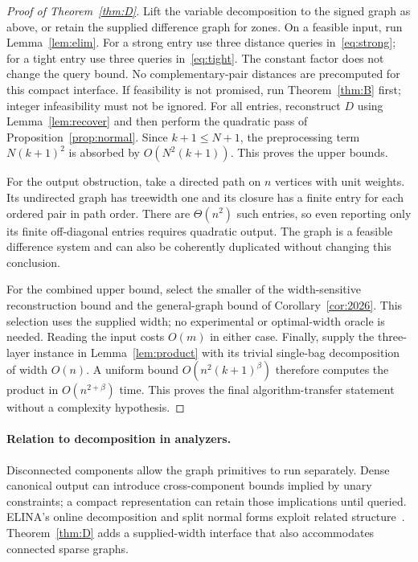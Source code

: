 \documentclass[manuscript,11pt,screen,nonacm]{acmart}
\theoremstyle{definition}
\begin{document}
\begin{proof}[Proof of Theorem~\ref{thm:D}]
Lift the variable decomposition to the signed graph as above, or retain the supplied difference graph for zones. On a feasible input, run Lemma~\ref{lem:elim}. For a strong entry use three distance queries in~\eqref{eq:strong}; for a tight entry use three queries in~\eqref{eq:tight}. The constant factor does not change the query bound. No complementary-pair distances are precomputed for this compact interface. If feasibility is not promised, run Theorem~\ref{thm:B} first; integer infeasibility must not be ignored. For all entries, reconstruct $D$ using Lemma~\ref{lem:recover} and then perform the quadratic pass of Proposition~\ref{prop:normal}. Since $k+1\leq N+1$, the preprocessing term $N(k+1)^2$ is absorbed by $O(N^2(k+1))$. This proves the upper bounds.

For the output obstruction, take a directed path on $n$ vertices with unit weights. Its undirected graph has treewidth one and its closure has a finite entry for each ordered pair in path order. There are $\Theta(n^2)$ such entries, so even reporting only its finite off-diagonal entries requires quadratic output. The graph is a feasible difference system and can also be coherently duplicated without changing this conclusion.

For the combined upper bound, select the smaller of the width-sensitive reconstruction bound and the general-graph bound of Corollary~\ref{cor:2026}. This selection uses the supplied width; no experimental or optimal-width oracle is needed. Reading the input costs $O(m)$ in either case. Finally, supply the three-layer instance in Lemma~\ref{lem:product} with its trivial single-bag decomposition of width $O(n)$. A uniform bound $O(n^2(k+1)^\beta)$ therefore computes the product in $O(n^{2+\beta})$ time. This proves the final algorithm-transfer statement without a complexity hypothesis.
\end{proof}

\paragraph{Relation to decomposition in analyzers.}
Disconnected components allow the graph primitives to run separately. Dense canonical output can introduce cross-component bounds implied by unary constraints; a compact representation can retain those implications until queried. ELINA's online decomposition and split normal forms exploit related structure~\cite{spv2015,gange2021}. Theorem~\ref{thm:D} adds a supplied-width interface that also accommodates connected sparse graphs.
\end{document}
